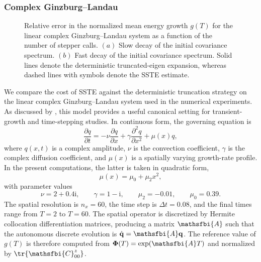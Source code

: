 \begin{appendices}
\subsubsection{Complex Ginzburg--Landau}
\label{sec:appendix_verification_gl}
\begin{figure}
    \centering
    \begin{minipage}[t]{0.48\textwidth}
        \centering
        \vspace{0pt}
        
    \end{minipage}
    \hfill
    \begin{minipage}[t]{0.48\textwidth}
        \centering
        \vspace{0pt}
        
    \end{minipage}
    \caption{
    Relative error in the normalized mean energy growth \(g(T)\) for the linear complex Ginzburg--Landau system as a function of the number of stepper calls. 
    \((a)\) Slow decay of the initial covariance spectrum. 
    \((b)\) Fast decay of the initial covariance spectrum. 
    Solid lines denote the deterministic truncated-eigen expansion, whereas dashed lines with symbols denote the SSTE estimate.
    }
    \label{fig:GL_eig_vs_sste}
\end{figure}
We compare the cost of SSTE against the deterministic truncation strategy on the linear complex Ginzburg--Landau system used in the numerical experiments. As discussed by \citet{frame-towne-2024}, this model provides a useful canonical setting for transient-growth and time-stepping studies. In continuous form, the governing equation is
\begin{equation}
  \frac{\partial q}{\partial t}
  =
  -\nu\frac{\partial q}{\partial x}
  +
  \gamma\frac{\partial^2 q}{\partial x^2}
  +
  \mu(x)q,
  \label{eq:GL_continuous_equation_sste_necessity}
\end{equation}
where \(q(x,t)\) is a complex amplitude, \(\nu\) is the convection coefficient, \(\gamma\) is the complex diffusion coefficient, and \(\mu(x)\) is a spatially varying growth-rate profile. In the present computations, the latter is taken in quadratic form,
\begin{equation}
  \mu(x)
  =
  \mu_0+\mu_2x^2,
  \label{eq:GL_mu_profile_sste_necessity}
\end{equation}
with parameter values
\begin{equation}
  \nu = 2+0.4\mathrm{i},
  \qquad
  \gamma = 1-\mathrm{i},
  \qquad
  \mu_2 = -0.01,
  \qquad
  \mu_0 = 0.39.
  \label{eq:GL_parameters_sste_necessity}
\end{equation}
The spatial resolution is \(n_x=60\), the time step is \(\Delta t=0.08\), and the final times range from \(T=2\) to \(T=60\). The spatial operator is discretized by Hermite collocation differentiation matrices, producing a matrix \(\mathsfbi{A}\) such that the autonomous discrete evolution is \(\dot{\mathbf{q}}=\mathsfbi{A}\mathbf{q}\). The reference value of \(g(T)\) is therefore computed from \(\boldsymbol{\Phi}(T)=\exp(\mathsfbi{A}T)\) and normalized by \(\tr\!\left\{\mathsfbi{C}_{00}^{z}\right\}\).


\end{appendices}

